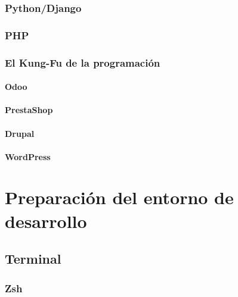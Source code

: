 \documentclass[a4paper,11pt,spanish]{sphinxmanual}
\begin{document}
\subsubsection{Python/Django}
\label{\detokenize{introduccion:python-django}}

\subsubsection{PHP}
\label{\detokenize{introduccion:php}}

\subsubsection{El Kung-Fu de la programación}
\label{\detokenize{introduccion:el-kung-fu-de-la-programacion}}

\paragraph{Odoo}
\label{\detokenize{introduccion:odoo}}

\paragraph{PrestaShop}
\label{\detokenize{introduccion:prestashop}}

\paragraph{Drupal}
\label{\detokenize{introduccion:drupal}}

\paragraph{WordPress}
\label{\detokenize{introduccion:wordpress}}

\section{Preparación del entorno de desarrollo}
\label{\detokenize{introduccion:preparacion-del-entorno-de-desarrollo}}

\subsection{Terminal}
\label{\detokenize{introduccion:terminal}}

\subsubsection{Zsh}
\label{\detokenize{introduccion:zsh}}
\end{document}
